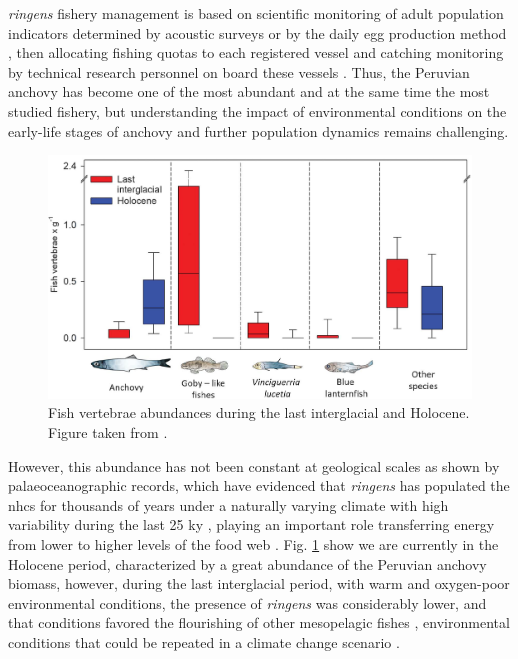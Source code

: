 \textit{\gls{ringens}} fishery management is based on scientific monitoring of adult population indicators determined by acoustic surveys \citep{GutiSwar2007} or by the daily egg production method \citep{Ayon2000}, then allocating fishing quotas to each registered vessel and catching monitoring by technical research personnel on board these vessels \citep{KroeSanc2019}. Thus, the Peruvian anchovy has become one of the most abundant and at the same time the most studied fishery, but understanding the impact of environmental conditions on the early-life stages of anchovy and further population dynamics remains challenging.\\

\begin{figure}[ht]
	\includegraphics[width=1.0\textwidth]{figures/Chap1VertebraeAbundances.png}
	\centering
	\caption{Fish vertebrae abundances during the last interglacial and Holocene. Figure taken from \cite{Salv2022}.}
	\label{Chap1VertebraeAbundances}
\end{figure}

However, this abundance has not been constant at geological scales as shown by palaeoceanographic records, which have evidenced that \textit{\gls{ringens}} has populated the \acrshort{nhcs} for thousands of years under a naturally varying climate with high variability during the last 25 ky \citep{Salv2018,Salv2019,Salv2022}, playing an important role transferring energy from lower to higher levels of the food web \citep{ChecAsch2017}. Fig. \ref{Chap1VertebraeAbundances} show we are currently in the Holocene period, characterized by a great abundance of the Peruvian anchovy biomass, however, during the last interglacial period, with warm and oxygen-poor environmental conditions, the presence of \textit{\gls{ringens}} was considerably lower, and that conditions favored the flourishing of other mesopelagic fishes \citep{Salv2022}, environmental conditions that could be repeated in a climate change scenario \citep{EcheGeva2020}.\\

